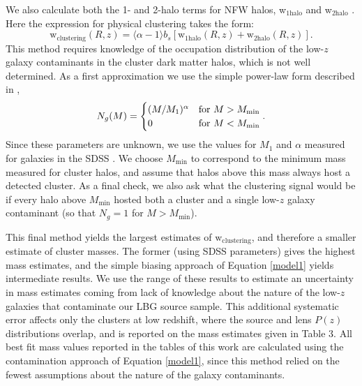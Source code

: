 We also calculate both the 1- and 2-halo terms for \ac{NFW} halos, w$_{\mathrm{1halo}}$ and w$_{\mathrm{2halo}}$ \citep[again using the code and methods described in][]{Hamana04}. Here the expression for physical clustering takes the form:
\begin{equation}
\mathrm{w}_{\mathrm{clustering}}(R,z) = \langle \alpha-1 \rangle b_{s} \left[\mathrm{w}_{\mathrm{1halo}}(R,z)+\mathrm{w}_{\mathrm{2halo}}(R,z)\right].
\end{equation}
This method requires knowledge of the occupation distribution of the low-$z$ galaxy contaminants in the cluster dark matter halos, which is not well determined. As a first approximation we use the simple power-law form described in \citet{Hamana04},
\begin{equation}
N_g(M) = \begin{cases} (M/M_1)^\alpha & \text{for $M > M_{\mathrm{min}}$} \\ 0 & \text{for $ M < M_{\mathrm{min}}$} \end{cases}.
\end{equation}
Since these parameters are unknown, we use the values for $M_1$ and $\alpha$ measured for galaxies in the SDSS \citep[see Table 3 of][]{Zehavi11}. We choose $M_{\mathrm{min}}$ to correspond to the minimum mass measured for cluster halos, and assume that halos above this mass always host a detected cluster. As a final check, we also ask what the clustering signal would be if every halo above $M_{\mathrm{min}}$ hosted both a cluster and a single low-$z$ galaxy contaminant (so that $N_g = 1$ for $M > M_{\mathrm{min}}$).

This final method yields the largest estimates of $\mathrm{w}_{\mathrm{clustering}}$, and therefore a smaller estimate of cluster masses. The former (using SDSS parameters) gives the highest mass estimates, and the simple biasing approach of Equation \ref{model1} yields intermediate results. We use the range of these results to estimate an uncertainty in mass estimates coming from lack of knowledge about the nature of the low-$z$ galaxies that contaminate our \ac{LBG} source sample. This additional systematic error affects only the clusters at low redshift, where the source and lens $P(z)$ distributions overlap, and is reported on the mass estimates given in Table 3. All best fit mass values reported in the tables of this work are calculated using the contamination approach of Equation \ref{model1}, since this method relied on the fewest assumptions about the nature of the galaxy contaminants.


